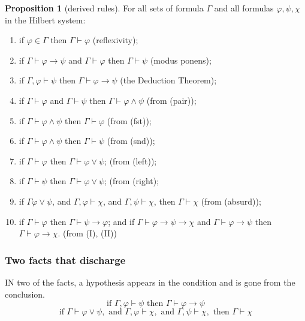 \documentclass[a4paper, 11pt]{article}
\theoremstyle{definition}
\newtheorem{prop}[definition]{Proposition}
\begin{document}
\begin{prop}[derived rules]
    For all sets of formula $\Gamma$ and all formulas $\varphi, \psi, \chi$ in the Hilbert system:
    \begin{enumerate}
        \item if $\varphi \in \Gamma$ then $\Gamma \vdash \varphi$ (reflexivity);
        \item if $\Gamma \vdash \varphi \to \psi$ and $\Gamma \vdash \varphi$ then $\Gamma \vdash \psi$ (modus ponens);
        \item if $\Gamma, \varphi \vdash \psi$ then $\Gamma \vdash \varphi \to \psi$ (the Deduction Theorem);
        \item if $\Gamma \vdash \varphi$ and $\Gamma \vdash \psi$ then $\Gamma \vdash \varphi \land \psi$ (from (pair));
        \item if $\Gamma \vdash \varphi \land \psi$ then $\Gamma \vdash \varphi$ (from (fst));
        \item if $\Gamma \vdash \varphi \land \psi$ then $\Gamma \vdash \psi$ (from (snd));
        \item if $\Gamma \vdash \varphi$ then $\Gamma \vdash \varphi \lor \psi$; (from (left));
        \item if $\Gamma \vdash \psi$ then $\Gamma \vdash \varphi \lor \psi$; (from (right);
        \item if $\Gamma \varphi \lor \psi$, and $\Gamma, \varphi \vdash \chi$, and $\Gamma, \psi \vdash \chi$,
        then $\Gamma \vdash \chi$ (from (absurd));
        \item if $\Gamma \vdash \varphi$ then $\Gamma \vdash \psi \to \varphi$; and if $\Gamma \vdash \varphi \to \psi
        \to \chi$ and $\Gamma \vdash \varphi \to \psi$ then $\Gamma \vdash \varphi \to \chi$. (from (I), (II))
    \end{enumerate}
\end{prop}

\subsubsection{Two facts that discharge}
IN two of the facts, a hypothesis appears in the condition and is gone from the conclusion.
\[\text{if } \Gamma, \varphi \vdash \psi \text{ then } \Gamma \vdash \varphi \to \psi \]
\[\text{if } \Gamma \vdash \varphi \lor \psi, \text{ and } \Gamma, \varphi \vdash \chi, \text{ and } \Gamma, \psi \vdash
\chi, \text{ then } \Gamma \vdash \chi\]
\end{document}
